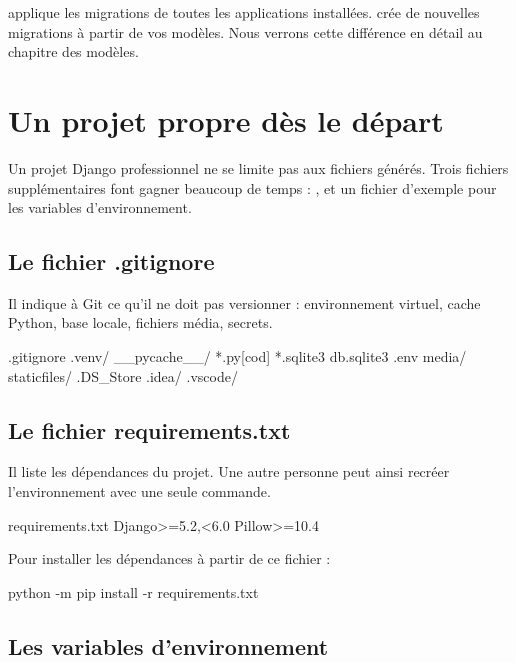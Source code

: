\begin{note}
 applique les migrations de toutes les applications installées.
 crée de nouvelles migrations à partir de vos modèles. Nous
verrons cette différence en détail au chapitre des modèles.
\end{note}

\section{Un projet propre dès le départ}

Un projet Django professionnel ne se limite pas aux fichiers générés. Trois
fichiers supplémentaires font gagner beaucoup de temps : ,
 et un fichier d'exemple pour les variables
d'environnement.

\subsection{Le fichier .gitignore}

Il indique à Git ce qu'il ne doit pas versionner : environnement virtuel, cache
Python, base locale, fichiers média, secrets.

\begin{codebox}[tree]{.gitignore}
.venv/
__pycache__/
*.py[cod]
*.sqlite3
db.sqlite3
.env
media/
staticfiles/
.DS_Store
.idea/
.vscode/
\end{codebox}

\subsection{Le fichier requirements.txt}

Il liste les dépendances du projet. Une autre personne peut ainsi recréer
l'environnement avec une seule commande.

\begin{codebox}[tree]{requirements.txt}
Django>=5.2,<6.0
Pillow>=10.4
\end{codebox}

Pour installer les dépendances à partir de ce fichier :

\begin{terminal}
python -m pip install -r requirements.txt
\end{terminal}

\subsection{Les variables d'environnement}

